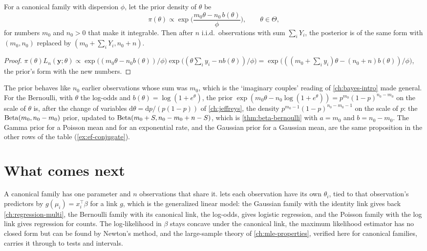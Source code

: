 \begin{proposition}
\label{prop:ef-conjugate}
For a canonical family with dispersion $\phi$, let the prior density of $\theta$ be
\[
\pi(\theta) \propto \exp\Big(\frac{m_0\theta - n_0\,b(\theta)}{\phi}\Big), \qquad \theta \in \Theta,
\]
for numbers $m_0$ and $n_0 > 0$ that make it integrable.
Then after $n$ i.i.d.\ observations with sum $\sum_i Y_i$, the posterior is of the same form with $(m_0, n_0)$ replaced by $(m_0 + \sum_i Y_i, n_0 + n)$.
\end{proposition}
\begin{proof}
$\pi(\theta)L_n(\mathbf{y}; \theta) \propto \exp\big((m_0\theta - n_0b(\theta))/\phi\big)\exp\big((\theta\sum_i y_i - nb(\theta))/\phi\big) = \exp\big(((m_0 + \sum_i y_i)\theta - (n_0 + n)b(\theta))/\phi\big)$, the prior's form with the new numbers.
\end{proof}

The prior behaves like $n_0$ earlier observations whose sum was $m_0$, which is the `imaginary couples' reading of \cref{ch:bayes-intro} made general.
For the Bernoulli, with $\theta$ the log-odds and $b(\theta) = \log(1 + e^\theta)$, the prior $\exp(m_0\theta - n_0\log(1 + e^\theta)) = p^{m_0}(1 - p)^{n_0 - m_0}$ on the scale of $\theta$ is, after the change of variables $\mathrm{d}\theta = \mathrm{d}p/(p(1-p))$ of \cref{ch:jeffreys}, the density $p^{m_0 - 1}(1 - p)^{n_0 - m_0 - 1}$ on the scale of $p$: the $\mathrm{Beta}(m_0, n_0 - m_0)$ prior, updated to $\mathrm{Beta}(m_0 + S, n_0 - m_0 + n - S)$, which is \cref{thm:beta-bernoulli} with $a = m_0$ and $b = n_0 - m_0$.
The Gamma prior for a Poisson mean and for an exponential rate, and the Gaussian prior for a Gaussian mean, are the same proposition in the other rows of the table (\cref{ex:ef-conjugate}).

\section{What comes next}
\label{sec:ef-next}

A canonical family has one parameter and $n$ observations that share it.
 lets each observation have its own $\theta_i$, tied to that observation's predictors by $g(\mu_i) = x_i^\top\beta$ for a link $g$, which is the generalized linear model: the Gaussian family with the identity link gives back \cref{ch:regression-multi}, the Bernoulli family with its canonical link, the log-odds, gives logistic regression, and the Poisson family with the log link gives regression for counts.
The log-likelihood in $\beta$ stays concave under the canonical link, the maximum likelihood estimator has no closed form but can be found by Newton's method, and the large-sample theory of \cref{ch:mle-properties}, verified here for canonical families, carries it through to tests and intervals.

